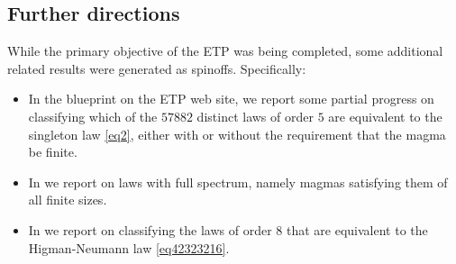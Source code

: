 \subsection{Further directions}

While the primary objective of the ETP was being completed, some additional related results were generated as spinoffs.  Specifically:
\begin{itemize}
\item In the blueprint on the ETP web site, we report some partial progress on classifying which of the $57882$ distinct laws of order $5$ are equivalent to the singleton law \eqref{eq2}, either with or without the requirement that the magma be finite.
\item In  we report on laws with full spectrum, namely magmas satisfying them of all finite sizes.
\item In  we report on classifying the laws of order $8$ that are equivalent to the Higman-Neumann law \eqref{eq42323216}.
\end{itemize}
